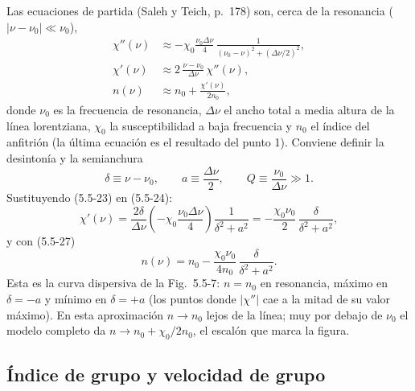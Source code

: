 \documentclass{article}
\begin{document}
Las ecuaciones de partida (Saleh y Teich, p.~178) son, cerca de la resonancia
($|\nu-\nu_0|\ll\nu_0$),
\begin{align}
\chi''(\nu)&\approx-\chi_0\frac{\nu_0\Delta\nu}{4}\,
\frac{1}{(\nu_0-\nu)^2+(\Delta\nu/2)^2}, \tag{5.5-23}\\
\chi'(\nu)&\approx2\,\frac{\nu-\nu_0}{\Delta\nu}\,\chi''(\nu), \tag{5.5-24}\\
n(\nu)&\approx n_0+\frac{\chi'(\nu)}{2n_0}, \tag{5.5-27}
\end{align}
donde $\nu_0$ es la frecuencia de resonancia, $\Delta\nu$ el ancho total a media altura de la
línea lorentziana, $\chi_0$ la susceptibilidad a baja frecuencia y $n_0$ el índice del anfitrión
(la última ecuación es el resultado del punto 1). Conviene definir la desintonía y la semianchura
\[
\delta\equiv\nu-\nu_0,\qquad a\equiv\frac{\Delta\nu}{2},\qquad Q\equiv\frac{\nu_0}{\Delta\nu}\gg1 .
\]
Sustituyendo (5.5-23) en (5.5-24):
\[
\chi'(\nu)=\frac{2\delta}{\Delta\nu}\left(-\chi_0\frac{\nu_0\Delta\nu}{4}\right)\frac{1}{\delta^2+a^2}
=-\frac{\chi_0\nu_0}{2}\,\frac{\delta}{\delta^2+a^2},
\]
y con (5.5-27)
\begin{equation}
n(\nu)=n_0-\frac{\chi_0\nu_0}{4n_0}\,\frac{\delta}{\delta^2+a^2}.
\label{eq:n_res}
\end{equation}
Esta es la curva dispersiva de la Fig.~5.5-7: $n=n_0$ en resonancia, máximo en $\delta=-a$ y
mínimo en $\delta=+a$ (los puntos donde $|\chi''|$ cae a la mitad de su valor máximo). En esta
aproximación $n\to n_0$ lejos de la línea; muy por debajo de $\nu_0$ el modelo completo da
$n\to n_0+\chi_0/2n_0$, el escalón que marca la figura.

\subsection*{Índice de grupo y velocidad de grupo}
\end{document}
